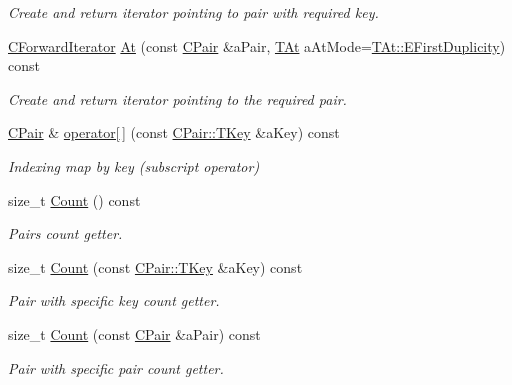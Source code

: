 \begin{DoxyCompactItemize}
\begin{DoxyCompactList}\small\item\em Create and return iterator pointing to pair with required key. \end{DoxyCompactList}\item 
\hyperlink{class_c_hash_map_1_1_c_forward_iterator}{C\+Forward\+Iterator} \hyperlink{class_c_hash_map_aed835e5c9cd93feab471205195fa749c}{At} (const \hyperlink{class_c_pair}{C\+Pair} \&a\+Pair, \hyperlink{class_c_hash_map_a9c8b9ae56d510ae0ff5e9ba74ee9930d}{T\+At} a\+At\+Mode=\hyperlink{class_c_hash_map_a9c8b9ae56d510ae0ff5e9ba74ee9930da583fa6e6852d051c6e7f4b63cad9991f}{T\+At\+::\+E\+First\+Duplicity}) const
\begin{DoxyCompactList}\small\item\em Create and return iterator pointing to the required pair. \end{DoxyCompactList}\item 
\hyperlink{class_c_pair}{C\+Pair} \& \hyperlink{class_c_hash_map_a4e61bb9cef654ff2377598e8d737a732}{operator\mbox{[}$\,$\mbox{]}} (const \hyperlink{class_c_pair_a9030f3ef2a07301c105bdf17620ae66a}{C\+Pair\+::\+T\+Key} \&a\+Key) const
\begin{DoxyCompactList}\small\item\em Indexing map by key (subscript operator) \end{DoxyCompactList}\item 
size\+\_\+t \hyperlink{class_c_hash_map_a331800dc9d92d201377132fe62c9c9cf}{Count} () const
\begin{DoxyCompactList}\small\item\em Pairs count getter. \end{DoxyCompactList}\item 
size\+\_\+t \hyperlink{class_c_hash_map_a00fac949f93212d8aef15740308b59e1}{Count} (const \hyperlink{class_c_pair_a9030f3ef2a07301c105bdf17620ae66a}{C\+Pair\+::\+T\+Key} \&a\+Key) const
\begin{DoxyCompactList}\small\item\em Pair with specific key count getter. \end{DoxyCompactList}\item 
size\+\_\+t \hyperlink{class_c_hash_map_a4fd67146fd24f86bbb686561a6326ce7}{Count} (const \hyperlink{class_c_pair}{C\+Pair} \&a\+Pair) const
\begin{DoxyCompactList}\small\item\em Pair with specific pair count getter. \end{DoxyCompactList}\item 

\end{DoxyCompactItemize}
